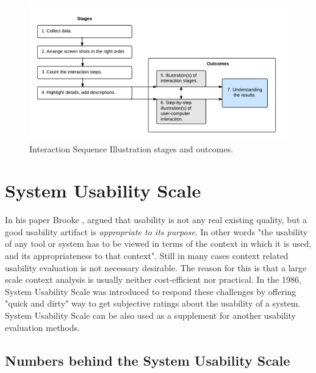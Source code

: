 \documentclass[12pt,a4paper,oneside,pdftex]{report}
\begin{document}
\begin{figure}[H]
  	\centerline{
  	\includegraphics[width=1.3\textwidth]{./images/isi_chart.png}
  	}
  	\caption{Interaction Sequence Illustration stages and outcomes.}
	\label{fig:isi_chart}
\end{figure}

\section{System Usability Scale}
\label{sec:sus}
In his paper Brooke \cite{RefWorks:10}, argued that usability is not any real existing quality, but a good usability artifact is \emph{appropriate to its purpose}. In other words "the usability of any tool or system has to be viewed in terms of the context in which it is 			used, and its appropriateness to that context"\cite{RefWorks:10}. Still in many cases context related usability evaluation is not necessary desirable. The reason for this is that a large scale context analysis is usually neither cost-efficient nor practical.\cite{RefWorks:10} In the 1986, System Usability Scale was introduced to respond these challenges by offering "quick and dirty"\cite{RefWorks:10} way to get subjective ratings about the usability of a system. \cite{RefWorks:12, RefWorks:35} System Usability Scale can be also used as a supplement for another usability evaluation methods.




\subsection{Numbers behind the System Usability Scale}
\end{document}
